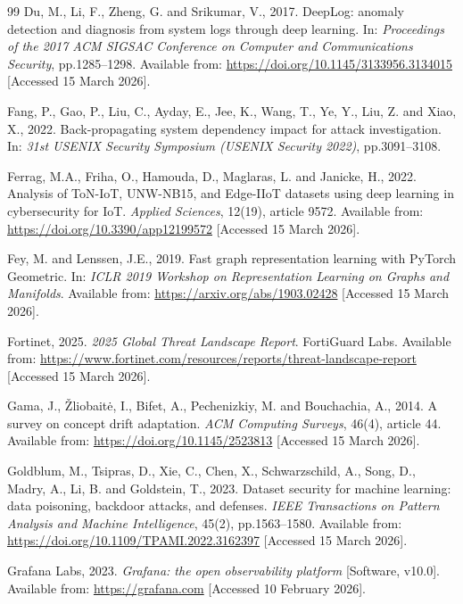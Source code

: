 \documentclass[12pt,a4paper]{report}
\begin{document}
\begin{thebibliography}{99}
Du, M., Li, F., Zheng, G. and Srikumar, V., 2017. DeepLog: anomaly detection and diagnosis from system logs through deep learning. In: \textit{Proceedings of the 2017 ACM SIGSAC Conference on Computer and Communications Security}, pp.1285--1298. Available from: \url{https://doi.org/10.1145/3133956.3134015} [Accessed 15 March 2026].

Fang, P., Gao, P., Liu, C., Ayday, E., Jee, K., Wang, T., Ye, Y., Liu, Z. and Xiao, X., 2022. Back-propagating system dependency impact for attack investigation. In: \textit{31st USENIX Security Symposium (USENIX Security 2022)}, pp.3091--3108.

Ferrag, M.A., Friha, O., Hamouda, D., Maglaras, L. and Janicke, H., 2022. Analysis of ToN-IoT, UNW-NB15, and Edge-IIoT datasets using deep learning in cybersecurity for IoT. \textit{Applied Sciences}, 12(19), article 9572. Available from: \url{https://doi.org/10.3390/app12199572} [Accessed 15 March 2026].

Fey, M. and Lenssen, J.E., 2019. Fast graph representation learning with PyTorch Geometric. In: \textit{ICLR 2019 Workshop on Representation Learning on Graphs and Manifolds}. Available from: \url{https://arxiv.org/abs/1903.02428} [Accessed 15 March 2026].

Fortinet, 2025. \textit{2025 Global Threat Landscape Report}. FortiGuard Labs. Available from: \url{https://www.fortinet.com/resources/reports/threat-landscape-report} [Accessed 15 March 2026].

Gama, J., \v{Z}liobait\.{e}, I., Bifet, A., Pechenizkiy, M. and Bouchachia, A., 2014. A survey on concept drift adaptation. \textit{ACM Computing Surveys}, 46(4), article 44. Available from: \url{https://doi.org/10.1145/2523813} [Accessed 15 March 2026].

Goldblum, M., Tsipras, D., Xie, C., Chen, X., Schwarzschild, A., Song, D., Madry, A., Li, B. and Goldstein, T., 2023. Dataset security for machine learning: data poisoning, backdoor attacks, and defenses. \textit{IEEE Transactions on Pattern Analysis and Machine Intelligence}, 45(2), pp.1563--1580. Available from: \url{https://doi.org/10.1109/TPAMI.2022.3162397} [Accessed 15 March 2026].

Grafana Labs, 2023. \textit{Grafana: the open observability platform} [Software, v10.0]. Available from: \url{https://grafana.com} [Accessed 10 February 2026].


\end{thebibliography}
\end{document}
